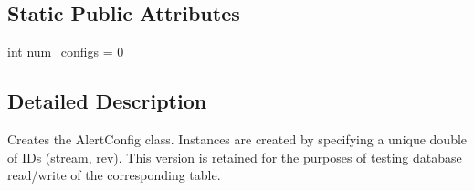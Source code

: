 \subsection*{Static Public Attributes}
\begin{DoxyCompactItemize}
\item 
int \hyperlink{classamonpy_1_1dbase_1_1db__classes_1_1_alert_config_ad02d71bf530446fdd3e8e87fb82bafb8}{num\-\_\-configs} = 0
\end{DoxyCompactItemize}


\subsection{Detailed Description}
\begin{DoxyVerb}Creates the AlertConfig class. Instances are created by specifying
    a unique double of IDs (stream, rev). This version is retained for
    the purposes of testing database read/write of the corresponding table.
\end{DoxyVerb}
 

